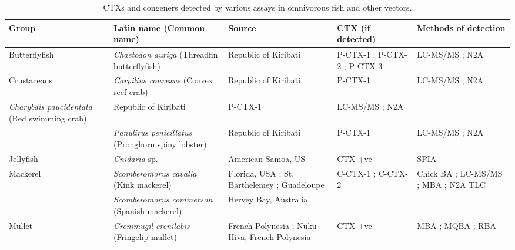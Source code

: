 \documentclass[12pt]{article}
\begin{document}
	\begin{longtable}{ | p{2cm} | p{3cm} | p{4.5cm} | p{2cm} | p{3cm} | }
	\caption{CTXs and congeners detected by various assays in omnivorous fish and other vectors.}\\
	\label{tbl:OmniTable}
	\textbf{Group} & \textbf{Latin name} (Common name) & \textbf{Source} & \textbf{CTX (if detected)} & \textbf{Methods of detection} \\
	\hline
	Butterflyfish & \emph{Chaetodon auriga} (Threadfin butterflyfish) & Republic of Kiribati \cite{mak2013pacific} & P-CTX-1 \cite{mak2013pacific}; P-CTX-2 \cite{mak2013pacific}; P-CTX-3 \cite{mak2013pacific} & LC-MS/MS \cite{mak2013pacific}; N2A \cite{mak2013pacific} \\
	\hline
	Crustaceans & \emph{Carpilius convexus} (Convex reef crab) & Republic of Kiribati \cite{mak2013pacific} & P-CTX-1 \cite{mak2013pacific} & LC-MS/MS \cite{mak2013pacific}; N2A \cite{mak2013pacific} \\
	 \emph{Charybdis paucidentata} (Red swimming crab) & Republic of Kiribati \cite{mak2013pacific} & P-CTX-1 \cite{mak2013pacific} & LC-MS/MS \cite{mak2013pacific}; N2A \cite{mak2013pacific} \\
	& \emph{Panulirus penicillatus} (Pronghorn spiny lobster) & Republic of Kiribati \cite{mak2013pacific} & P-CTX-1 \cite{mak2013pacific} & LC-MS/MS \cite{mak2013pacific}; N2A \cite{mak2013pacific} \\
	\hline
	Jellyfish & \emph{Cnidaria} sp. & American Samoa, US \cite{zlotnick1995ciguatera} & CTX +ve \cite{zlotnick1995ciguatera} & SPIA \cite{zlotnick1995ciguatera} \\
	\hline
	Mackerel & \emph{Scomberomorus cavalla} (Kink mackerel) & Florida, USA \cite{dickey2008ciguatera}; St. Barthelemey \cite{pottier2001ciguatera,vernoux1986heterogeneity}; Guadeloupe \cite{pottier2001ciguatera} & C-CTX-1 \cite{dickey2008ciguatera}; C-CTX-2 \cite{dickey2008ciguatera} & Chick BA \cite{pottier2001ciguatera}; LC-MS/MS \cite{dickey2008ciguatera}; MBA \cite{vernoux1986heterogeneity}; N2A \cite{dickey2008ciguatera} TLC \cite{vernoux1986heterogeneity} \\
	& \emph{Scomberomorus commerson} (Spanish mackerel) & Hervey Bay, Australia \cite{} & & \\ %
	\hline
	Mullet & \emph{Crenimugil crenilabis} (Fringelip mullet) & French Polynesia \cite{bagnis1987use}; Nuku Hiva, French Polynesia \cite{darius2007ciguatera} & CTX +ve \cite{darius2007ciguatera} & MBA \cite{bagnis1987use}; MQBA \cite{bagnis1987use}; RBA \cite{darius2007ciguatera}\\

\end{longtable}
\end{document}

